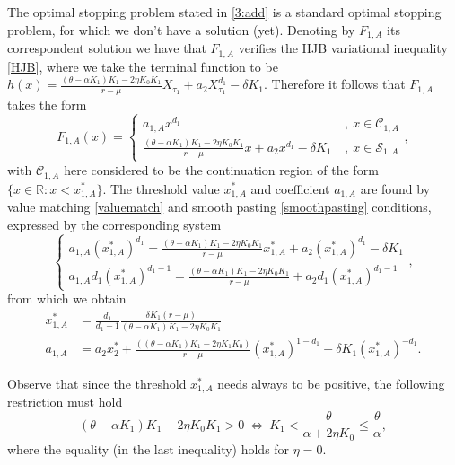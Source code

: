 The optimal stopping problem stated in \eqref{3:add} is a standard optimal stopping problem, for which we don't have a solution (yet).
Denoting by $F_{1,A}$ its correspondent solution we have that $F_{1,A}$ verifies the HJB variational inequality \eqref{HJB}, where we take the terminal function to be $h(x)=\frac{(\theta-\alpha K_1)K_1-2 \eta K_0 K_1}{r-\mu} X_{\tau_1}+
a_2 X_{\tau_1}^{d_1} - \delta K_1$. Therefore it follows that $F_{1,A}$ takes the form
\begin{equation}
F_{1,A}(x)=\begin{cases} a_{1,A} x^{d_1}  &\ , \ x \in \mathcal{C}_{1,A} \\
\frac{(\theta-\alpha K_1)K_1-2 \eta K_0 K_1}{r-\mu} x+
a_2 x^{d_1} - \delta K_1 &\ , \ x \in \mathcal{S}_{1,A}
\end{cases},
\label{3_F1A}
\end{equation}
with $\mathcal{C}_{1,A}$ here considered to be the continuation region of the form $\{ x \in \mathds{R}: x<x^*_{1,A} \}$. The threshold value $x_{1,A}^*$ and coefficient $a_{1,A}$ are found by value matching \eqref{valuematch} and smooth pasting \eqref{smoothpasting} conditions, expressed by the corresponding system
\begin{equation}
\begin{cases} a_{1,A} (x_{1,A}^*)^{d_1}=\frac{(\theta-\alpha K_1)K_1-2 \eta K_0 K_1}{r-\mu} x_{1,A}^*+
a_2 (x_{1,A}^*)^{d_1} - \delta K_1\\
a_{1,A} d_1(x_{1,A}^*)^{d_1-1}=\frac{(\theta-\alpha K_1)K_1-2 \eta K_0 K_1}{r-\mu}+
a_2 d_1 (x_{1,A}^*)^{d_1-1}
\end{cases},
\label{eq:3_sistema}
\end{equation}
from which we obtain
\begin{align}
x_{1,A}^*&=\frac{d_1}{d_1-1} \frac{\delta K_1 (r-\mu )}{ (\theta -\alpha  K_1)K_1-2 \eta  K_0 K_1} \label{eq:3_x1A}\\
a_{1,A}&=
a_2 x^*_2+\frac{((\theta -\alpha  K_1)K_1-2 \eta  K_1 K_0) }{r-\mu }(x_{1,A}^*)^{1-d_1}-\delta K_1 (x_{1,A}^*)^{-d_1}.
\label{3:a1A} 
\end{align}

Observe that since the threshold $x_{1,A}^*$ needs always to be positive, the following restriction must hold
\begin{equation}
	(\theta -\alpha  K_1)K_1-2 \eta  K_0 K_1>0 \ \Leftrightarrow \ K_1 < \frac{\theta}{\alpha + 2\eta K_0} \leq \frac{\theta}{\alpha},
	\label{3_cond}
\end{equation}
where the equality (in the last inequality) holds for $\eta=0$. 

